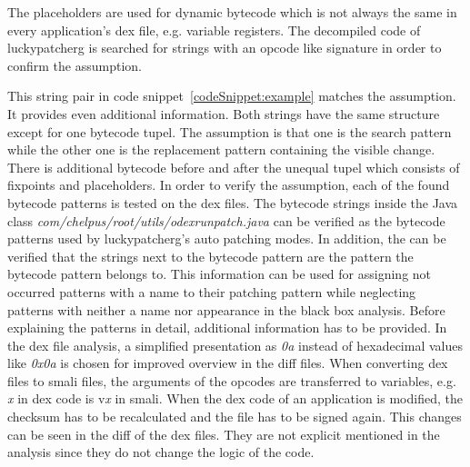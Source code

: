 The placeholders are used for dynamic bytecode which is not always the same in every application’s \gls{dex} file, e.g. variable registers.
\newline
The decompiled code of \gls{luckypatcherg} is searched for strings with an opcode like signature in order to confirm the assumption.
\newline

This string pair in code snippet~\ref{codeSnippet:example} matches the assumption.
It provides even additional information.
Both strings have the same structure except for one bytecode tupel.
The assumption is that one is the search pattern while the other one is the replacement pattern containing the visible change.
There is additional bytecode before and after the unequal tupel which consists of fixpoints and placeholders.
\newline
In order to verify the assumption, each of the found bytecode patterns is tested on the \gls{dex} files.
The bytecode strings inside the Java class \textit{com/chelpus/root/utils/odexrunpatch.java} can be verified as the bytecode patterns used by \gls{luckypatcherg}’s auto patching modes.
In addition, the can be verified that the strings next to the bytecode pattern are the pattern the bytecode pattern belongs to.
This information can be used for assigning not occurred patterns with a name to their patching pattern while neglecting patterns with neither a name nor appearance in the black box analysis.
\newline
\newline
Before explaining the patterns in detail, additional information has to be provided.
In the \gls{dex} file analysis, a simplified presentation as \textit{0a} instead of hexadecimal values like \textit{0x0a} is chosen for improved overview in the diff files.
When converting \gls{dex} files to smali files, the arguments of the opcodes are transferred to variables, e.g. \textit{x} in dex code is v\textit{x} in smali.
\newline
\newline
When the dex code of an application is modified, the checksum has to be recalculated and the file has to be signed again.
This changes can be seen in the diff of the dex files.
They are not explicit mentioned in the analysis since they do not change the logic of the code.

